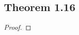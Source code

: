 \documentclass[../../main.tex]{subfiles}
\begin{document}
\subsection{Theorem 1.16}
\begin{wts}

\end{wts}
\begin{proof}

\end{proof}
\end{document}
